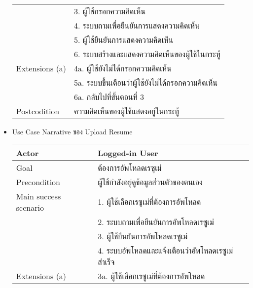 \begin{itemize}
\begin{table}[!h]
\begin{tabular}{|l|l|}
                                        & 3. ผู้ใช้กรอกความคิดเห็น                              \\
                                        & 4. ระบบถามเพื่อยืนยันการแสดงความคิดเห็น                \\
                                        & 5. ผู้ใช้ยืนยันการแสดงความคิดเห็น                       \\
                                        & 6. ระบบสร้างและแสดงความคิดเห็นของผู้ใช้ในกระทู้          \\ \hline
                  Extensions (a)        & 4a. ผู้ใช้ยังไม่ได้กรอกความคิดเห็น                       \\
                                        & 5a. ระบบขึ้นเตือนว่าผู้ใช้ยังไม่ได้กรอกความคิดเห็น           \\
                                        & 6a. กลับไปที่ขั้นตอนที่ 3                               \\ \hline
                  Postcodition          & ความคิดเห็นของผู้ใช้แสดงอยู่ในกระทู้                      \\ \hline
              \end{tabular}
          \end{table}
    \item Use Case Narrative ของ Upload Resume
          \begin{table}[!h]
              \begin{tabular}{|l|l|} \hline
                  Actor                 & Logged-in User                                  \\ \hline
                  Goal                  & ต้องการอัพโหลดเรซูเม่                               \\ \hline
                  Precondition          & ผู้ใช้กำลังอยู่ดูข้อมูลส่วนตัวของตนเอง                      \\ \hline
                  Main success scenario & 1. ผู้ใช้เลือกเรซูเม่ที่ต้องการอัพโหลด                    \\
                                        & 2. ระบบถามเพื่อยืนยันการอัพโหลดเรซูเม่                 \\
                                        & 3. ผู้ใช้ยืนยันการอัพโหลดเรซูเม่                        \\
                                        & 4. ระบบอัพโหลดและแจ้งเตือนว่าอัพโหลดเรซูเม่สำเร็จ        \\ \hline
                  Extensions (a)        & 3a. ผู้ใช้เลือกเรซูเม่ที่ต้องการอัพโหลด                   \\

\end{tabular}
\end{table}
\end{itemize}
